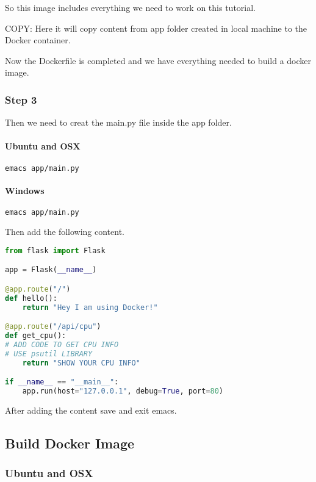 So this image includes everything we need to work on this tutorial.

COPY: Here it will copy content from app folder created in local machine
to the Docker container.

Now the Dockerfile is completed and we have everything needed to build a
docker image.

\subsubsection{Step 3}

Then we need to creat the main.py file inside the app folder.

\paragraph{Ubuntu and OSX}

\begin{lstlisting}[language=bash]
emacs app/main.py
\end{lstlisting}

\paragraph{Windows}

\begin{lstlisting}[language=bash]
emacs app/main.py
\end{lstlisting}

Then add the following content.

\begin{lstlisting}[language=python]
from flask import Flask

app = Flask(__name__)

@app.route("/")
def hello():
    return "Hey I am using Docker!"

@app.route("/api/cpu")
def get_cpu():
# ADD CODE TO GET CPU INFO
# USE psutil LIBRARY
    return "SHOW YOUR CPU INFO"

if __name__ == "__main__":
    app.run(host="127.0.0.1", debug=True, port=80)
\end{lstlisting}

After adding the content save and exit emacs.

\subsection{Build Docker Image}

\subsubsection{Ubuntu and OSX}

